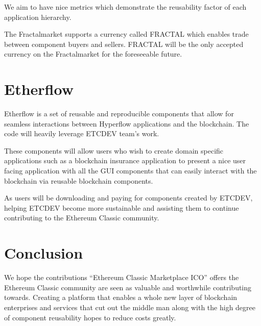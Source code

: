 \documentclass[%
 aip,
 jmp,%
 amsmath,amssymb,
 preprint,
 reprint,
 author-year,
 author-numerical,
]{revtex4-1}
\begin{document}
We aim to have nice metrics which demonstrate the reusability factor of each application hierarchy.

The Fractalmarket supports a currency called FRACTAL which enables trade between component buyers and sellers. FRACTAL will be the only accepted currency on the Fractalmarket for the foreseeable future.

\section{\label{sec:Etherflow}Etherflow}

Etherflow is a set of reusable and reproducible components that allow for seamless interactions between Hyperflow applications and the blockchain. The code will heavily leverage ETCDEV team's work.

These components will allow users who wish to create domain specific applications such as a blockchain insurance application to present a nice user facing application with all the GUI components that can easily interact with the blockchain via reusable blockchain components.

As users will be downloading and paying for components created by ETCDEV, helping ETCDEV become more sustainable and assisting them to continue contributing to the Ethereum Classic community.


\section{\label{sec:Conclusion}Conclusion}

We hope the contributions ``Ethereum Classic Marketplace ICO'' offers the Ethereum Classic community are seen as valuable and worthwhile contributing towards.
Creating a platform that enables a whole new layer of blockchain enterprises and services that cut out the middle man along with the high degree of component reusability hopes to reduce costs greatly.
\end{document}
